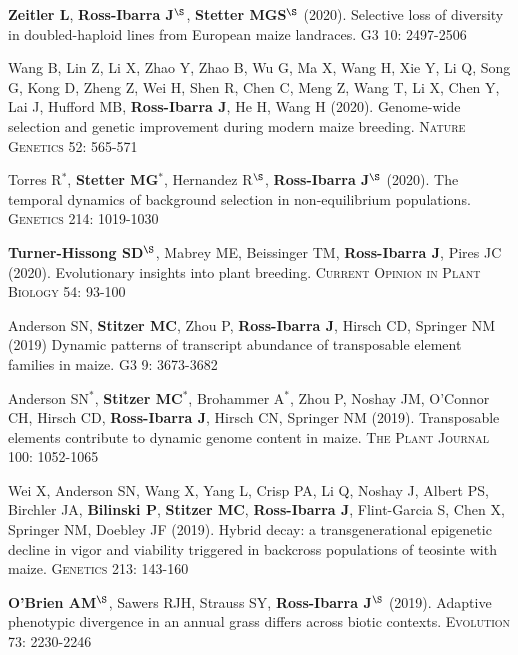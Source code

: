 \documentclass[letterpaper,10pt]{article}
\begin{document}
\begin{etaremune}
\item \textbf{Zeitler L}, \textbf{Ross-Ibarra J}$^\S$, \textbf{Stetter MGS}$^\S$ (2020). Selective loss of diversity in doubled-haploid lines from European maize landraces. \textsc{G3} 10: 2497-2506

\item Wang B, Lin Z, Li X, Zhao Y, Zhao B, Wu G, Ma X, Wang H, Xie Y, Li Q, Song G, Kong D, Zheng Z, Wei H, Shen R, Chen C, Meng Z, Wang T, Li X, Chen Y, Lai J, Hufford MB, \textbf{Ross-Ibarra J}, He H, Wang H (2020). Genome-wide selection and genetic improvement during modern maize breeding. \textsc{Nature Genetics} 52: 565-571

\item Torres R$^*$, \textbf{Stetter MG}$^*$, Hernandez R$^\S$, \textbf{Ross-Ibarra J}$^\S$ (2020). The temporal dynamics of background selection in non-equilibrium populations. \textsc{Genetics} 214: 1019-1030

\item \textbf{Turner-Hissong SD}$^\S$, Mabrey ME, Beissinger TM, \textbf{Ross-Ibarra J}, Pires JC (2020). Evolutionary insights into plant breeding. \textsc{Current Opinion in Plant Biology} 54: 93-100

\item  Anderson SN, \textbf{Stitzer MC},  Zhou P, \textbf{Ross-Ibarra J}, Hirsch CD, Springer NM (2019) Dynamic patterns of transcript abundance of transposable element families in maize. \textsc{G3} 9: 3673-3682

\item  Anderson SN$^*$, \textbf{Stitzer MC}$^*$,  Brohammer A$^*$, Zhou P, Noshay JM,  O'Connor CH, Hirsch CD, \textbf{Ross-Ibarra J}, Hirsch CN, Springer NM (2019). Transposable elements contribute to dynamic genome content in maize. \textsc{The Plant Journal} 100: 1052-1065

\item Wei X,  Anderson SN,  Wang X,  Yang L, Crisp PA,  Li Q,  Noshay J, Albert PS, Birchler JA,  \textbf{Bilinski P}, \textbf{Stitzer MC}, \textbf{Ross-Ibarra J},  Flint-Garcia S,  Chen X,  Springer NM, Doebley JF (2019). Hybrid decay: a transgenerational epigenetic decline in vigor and viability triggered in backcross populations of teosinte with maize. \textsc{Genetics} 213: 143-160

\item \textbf{O'Brien AM}$^\S$, Sawers RJH, Strauss SY, \textbf{Ross-Ibarra J}$^\S$ (2019). Adaptive phenotypic divergence in an annual grass differs across biotic contexts. \textsc{Evolution} 73: 2230-2246


\end{etaremune}
\end{document}
